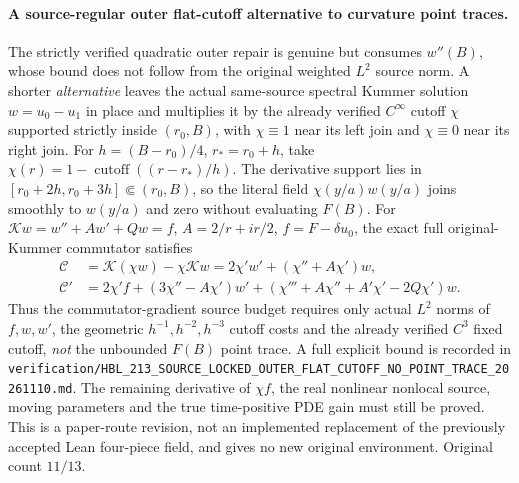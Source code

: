 \documentclass[11pt]{amsart}
\begin{document}
\paragraph{A source-regular outer flat-cutoff alternative to curvature point traces.}
The strictly verified quadratic outer repair is genuine
but consumes \(w''(B)\), whose bound does not follow
from the original weighted \(L^2\) source norm.
A shorter \emph{alternative} leaves the actual
same-source spectral Kummer solution \(w=u_0-u_1\)
in place and multiplies it by the already verified
\(C^\infty\) cutoff \(\chi\) supported strictly inside
\((r_0,B)\), with \(\chi\equiv1\) near its left join
and \(\chi\equiv0\) near its right join.
For \(h=(B-r_0)/4\), \(r_*=r_0+h\), take
\(\chi(r)=1-\operatorname{cutoff}((r-r_*)/h)\).
The derivative support lies in
\([r_0+2h,r_0+3h]\Subset(r_0,B)\),
so the literal field \(\chi(y/a)w(y/a)\)
joins smoothly to \(w(y/a)\) and zero
without evaluating \(F(B)\).
For \(\mathcal Kw=w''+Aw'+Qw=f\),
\(A=2/r+ir/2\), \(f=F-\delta u_0\),
the exact full original-Kummer commutator satisfies
\[
 \begin{aligned}
 \mathcal C&=\mathcal K(\chi w)-\chi\mathcal Kw
       =2\chi'w'+(\chi''+A\chi')w,\\
 \mathcal C'&=2\chi'f+(3\chi''-A\chi')w'
       +(\chi'''+A\chi''+A'\chi'-2Q\chi')w.
 \end{aligned}
\]
Thus the commutator-gradient source budget requires
only actual \(L^2\) norms of \(f,w,w'\),
the geometric \(h^{-1},h^{-2},h^{-3}\)
cutoff costs and the already verified \(C^3\)
fixed cutoff, \emph{not} the unbounded \(F(B)\)
point trace. A full explicit bound is recorded
in \texttt{verification/HBL\_213\_SOURCE\_LOCKED\_OUTER\_FLAT\_CUTOFF\_NO\_POINT\_TRACE\_20261110.md}.
The remaining derivative of \(\chi f\),
the real nonlinear nonlocal source, moving
parameters and the true time-positive PDE gain
must still be proved. This is a paper-route
revision, not an implemented replacement of
the previously accepted Lean four-piece field,
and gives no new original environment.
Original count \(11/13\).

\end{document}

